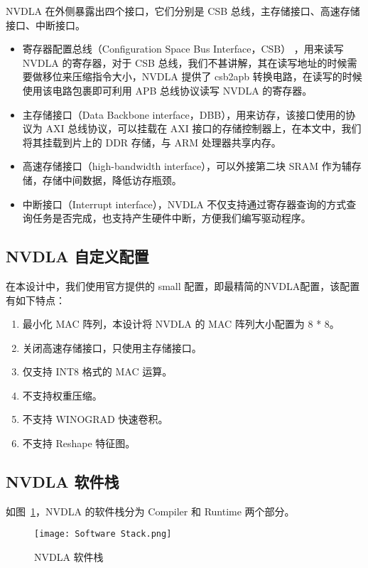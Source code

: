 NVDLA 在外侧暴露出四个接口，它们分别是 CSB 总线，主存储接口、高速存储接口、中断接口。

\begin{itemize}
    \item 寄存器配置总线（Configuration Space Bus Interface，CSB） ，用来读写 NVDLA 的寄存器，对于 CSB 总线，我们不甚讲解，其在读写地址的时候需要做移位来压缩指令大小，NVDLA 提供了 csb2apb 转换电路，在读写的时候使用该电路包裹即可利用 APB 总线协议读写 NVDLA 的寄存器。
    \item 主存储接口（Data Backbone interface，DBB），用来访存，该接口使用的协议为 AXI 总线协议，可以挂载在 AXI 接口的存储控制器上，在本文中，我们将其挂载到片上的 DDR 存储，与 ARM 处理器共享内存。
    \item 高速存储接口（high-bandwidth interface），可以外接第二块 SRAM 作为辅存储，存储中间数据，降低访存瓶颈。
    \item 中断接口（Interrupt interface），NVDLA 不仅支持通过寄存器查询的方式查询任务是否完成，也支持产生硬件中断，方便我们编写驱动程序。
\end{itemize}

\subsection{NVDLA 自定义配置}

在本设计中，我们使用官方提供的 small 配置，即最精简的NVDLA配置，该配置有如下特点：

\begin{enumerate}
    \item 最小化 MAC 阵列，本设计将 NVDLA 的 MAC 阵列大小配置为 8 * 8。
    \item 关闭高速存储接口，只使用主存储接口。
    \item 仅支持 INT8 格式的 MAC 运算。
    \item 不支持权重压缩。
    \item 不支持 WINOGRAD 快速卷积。
    \item 不支持 Reshape 特征图。
\end{enumerate}

\subsection{NVDLA 软件栈}

如图~\ref{fig:Software Stack}，NVDLA 的软件栈分为 Compiler 和 Runtime 两个部分。

\begin{figure}[!htbp]
    \centering
    \texttt{[image: Software Stack.png]}
    \caption{NVDLA 软件栈}
    \label{fig:Software Stack}
\end{figure}

